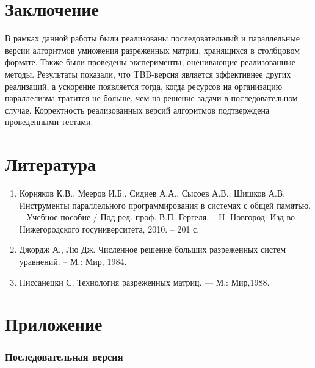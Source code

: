 \documentclass{report}
\begin{document}
\section*{Заключение}
\par В рамках данной работы были реализованы последовательный и параллельные версии алгоритмов умножения разреженных матриц, хранящихся в столбцовом формате. Также были проведены эксперименты, оценивающие реализованные методы. Результаты показали, что TBB-версия является эффективнее других реализаций, а ускорение появляется тогда, когда ресурсов на организацию параллелизма тратится не больше, чем на решение задачи в последовательном случае. Корректность реализованных версий алгоритмов подтверждена проведенными тестами.
\newpage

\section*{Литература}
\begin{enumerate}
	\item Корняков К.В., Мееров И.Б., Сиднев А.А., Сысоев А.В., Шишков А.В.
	Инструменты параллельного программирования в системах с общей
	памятью. – Учебное пособие / Под ред. проф. В.П. Гергеля. – Н. Новгород: Изд-во Нижегородского госуниверситета, 2010. – 201 с.
	\item Джордж А., Лю Дж. Численное решение больших разреженных систем уравнений. – М.: Мир, 1984.
	\item Писсанецки С. Технология разреженных матриц. — М.: Мир,1988.
\end{enumerate}
\newpage

\section*{Приложение}

\subsubsection*{Последовательная версия}



\newpage
\end{document}
